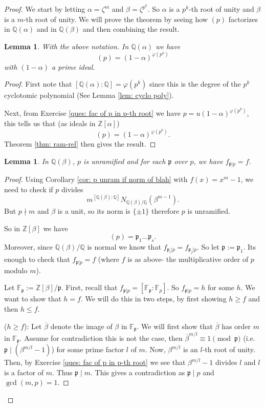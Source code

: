 \documentclass[11pt,a4paper]{report}
\theoremstyle{plain}
\newtheorem{lemma}[subsection]{Lemma}
\theoremstyle{definition}
\theoremstyle{definition}
\newcommand{\ZZ}{\mathbb{Z}}
\def\FF{\mathbb{F}}
\def\QQ{\mathbb{Q}}
\def\gothp{\mathfrak{p}}
\def \a{\alpha}
\def \ov{\overline}
\begin{document}
	\begin{proof}
		We start by letting $\a=\zeta^m$ and $\beta=\zeta^{p^k}$. So $\a$  is a $p^k$-th root of unity and $\beta$ is a $m$-th root of unity. We will prove the theorem by seeing how $(p)$ factorizes in $\QQ(\a)$ and in $\QQ(\beta)$ and then combining the result.
		
		\begin{lemma}\label{lem: lem1}
			With the above notation. In $\QQ(\a)$ we have \[(p)=(1-\a)^{\varphi(p^k)}\] with $(1-\a)$ a prime ideal.
		\end{lemma}
		
		\begin{proof}
			First note that $[\QQ(\a):\QQ]=\varphi(p^k)$ since this is the degree of the $p^k$ cyclotomic polynomial (See Lemma \ref{lem: cyclo poly}).
			
			Next, from Exercise \ref{ques: fac of p in p-th root} we have $p=u(1-\a)^{\varphi(p^k)}$, this tells us that (as ideals in $\ZZ[\a]$) \[(p)=(1-\a)^{\varphi(p^k)}.\] Theorem \ref{thm: ram-rel} then gives the result.
			
		\end{proof}
		
		\begin{lemma}\label{lem: lem2}
			In $\QQ(\beta)$, $p$ is unramified and for each $\gothp$ over $p$, we have $f_{\gothp|p}=f$.
		\end{lemma}
		
		\begin{proof}
			Using Corollary \ref{cor: p unram if norm of blah} with $f(x)=x^m-1$, we need to check if $p$ divides \[m^{[\QQ(\beta):\QQ]}N_{\QQ(\beta)/\QQ}(\beta^{m-1}).\] But $p \nmid m$ and $\beta$ is a unit, so its norm is $\{\pm 1\}$ therefore $p$ is unramified.
			
			So in $\ZZ[\beta]$ we have \[(p)=\gothp_1\dots\gothp_s.\] Moreover, since $\QQ(\beta)/\QQ$ is normal we know that $f_{\gothp_i|p}=f_{\gothp_j|p}$. So let $\gothp:=\gothp_1$. Its enough to check that $f_{\gothp|p}=f$ (where $f$ is as above- the multiplicative order of $p$ modulo $m$).
			
			Let $\FF_{\gothp}:=\ZZ[\beta]/\gothp$. First, recall that $f_{\gothp|p}=[\FF_\gothp: \FF_p]$. So $f_{\gothp|p}=h$ for some $h$. We want to show that $h=f$. We will do this in two steps, by first showing $h \geq f$ and then $h \leq f$.
			
			($h \geq f$): Let $\ov{\beta}$ denote the image of $\beta$ in $\FF_{\gothp}$. We will first show that $\ov{\beta}$ has order $m$ in $\FF_{\gothp}$. Assume for contradiction this is not the case, then $\ov{\beta}^{m/l} \equiv 1 \pmod \gothp$ (i.e. $\gothp \mid (\beta^{m/l}-1)$) for some prime factor $l$ of $m$. Now, $\beta^{m/l}$ is an $l$-th root of unity. Then, by Exercise \ref{ques: fac of p in p-th root} we see that $\beta^{m/l}-1$ divides $l$ and $l$ is a factor of $m$. Thus $\gothp \mid m$. This gives a contradiction as $\gothp \mid p$ and $\gcd(m,p)=1$.
			

\end{proof}
\end{proof}
\end{document}
